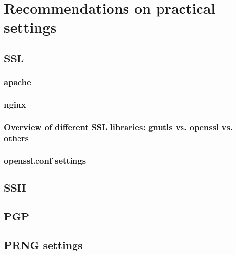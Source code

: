 \section{Recommendations on practical settings}


\subsection{SSL}
\subsubsection{apache}
\subsubsection{nginx}
\subsubsection{Overview of different SSL libraries: gnutls vs. openssl vs. others}
\subsubsection{openssl.conf settings}

\subsection{SSH}

\subsection{PGP}

\subsection{PRNG settings}

